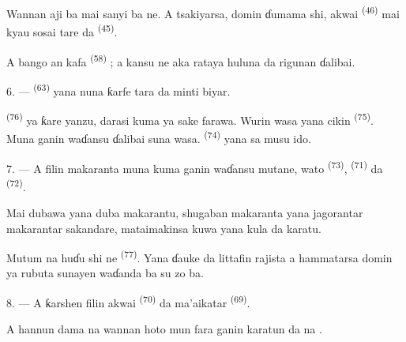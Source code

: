 Wannan aji ba mai sanyi ba ne. A tsakiyarsa, domin ɗumama shi, akwai
 \textsuperscript{(46)} mai kyau sosai tare da
 \textsuperscript{(45)}.

A bango an kafa  \textsuperscript{(58)} ; a
kansu ne aka rataya huluna da rigunan ɗalibai.

\VUsaut{5.2mm}
\VUsaut{3.6mm}

6. ---  \textsuperscript{(63)} yana nuna ƙarfe tara da
minti biyar.

 \textsuperscript{(76)} ya ƙare yanzu, darasi
kuma ya sake farawa. Wurin wasa yana cikin 
\textsuperscript{(75)}. Muna ganin waɗansu ɗalibai suna wasa.
 \textsuperscript{(74)} yana sa musu ido.

7. --- A filin makaranta muna kuma ganin waɗansu mutane, wato
 \textsuperscript{(73)},  \textsuperscript{(71)} da 
\textsuperscript{(72)}.

Mai dubawa yana duba makarantu, shugaban makaranta yana jagorantar
makarantar sakandare, mataimakinsa kuwa yana kula da karatu.

Mutum na huɗu shi ne  \textsuperscript{(77)}.
Yana ɗauke da littafin rajista a hammatarsa domin ya rubuta sunayen
waɗanda ba su zo ba.

8. --- A ƙarshen filin akwai 
\textsuperscript{(70)} da ma’aikatar 
\textsuperscript{(69)}.

A hannun dama na wannan hoto mun fara ganin  karatun
 da na .


\VUsaut{2.4mm}

